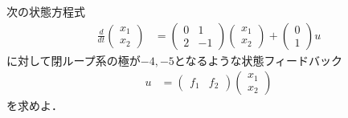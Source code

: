 次の状態方程式
\begin{align*}
	\frac{d}{dt}
	\left (
	\begin{array}{c}
	 x_1 \\ x_2 
	\end{array}
	\right )
	& = 
	\left (
	\begin{array}{cc}
	 0 & 1 \\
	 2 & -1
	\end{array}
	\right )
	\left (
	\begin{array}{c}
	 x_1 \\ x_2 
	\end{array}
	\right )
	+
	\left (
	\begin{array}{c}
	 0 \\ 1 
	\end{array}
	\right )
	u
\end{align*}
に対して閉ループ系の極が$-4,-5$となるような状態フィードバック
\begin{align*}
	u 
	&=
	\left (
	\begin{array}{cc}
	 f_1 & f_2
	\end{array}
	\right )
	\left (
	\begin{array}{c}
	 x_1 \\ x_2 
	\end{array}
	\right )
\end{align*}
を求めよ．
\\

